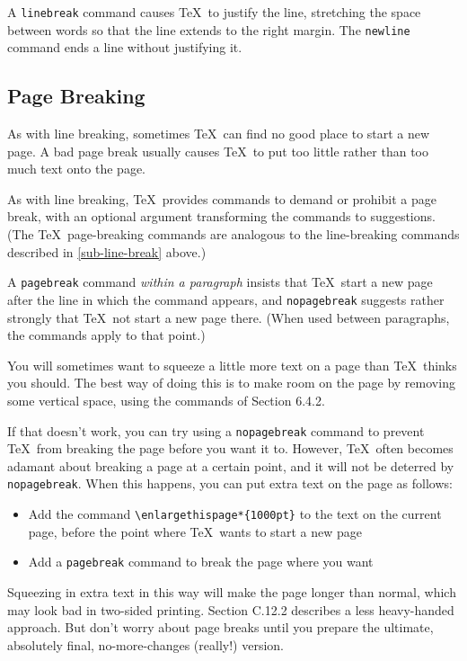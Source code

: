\documentclass{article}
\begin{document}
A \verb:linebreak: command causes \TeX\ to justify the line, stretching the space between words so that the line extends to the right margin. The \verb:newline: command ends a line without justifying it.

\subsection{Page Breaking}

As with line breaking, sometimes \TeX\ can find no good place to start a new page. A bad page break
usually causes \TeX\ to put too little rather than too much text onto the page.

As with line breaking, \TeX\ provides commands to demand or prohibit a page break, with an optional
argument transforming the commands to suggestions. (The \TeX\ page-breaking commands are analogous
to the line-breaking commands described in \ref{sub-line-break} above.)

A \verb:pagebreak: command \emph{within a paragraph} insists that \TeX\ start a new page after
the line in which the command appears, and \verb:nopagebreak: suggests rather strongly
that \TeX\ not start a new page there. (When used between paragraphs, the commands apply to that
point.)

You will sometimes want to squeeze a little more text on a page than \TeX\ thinks you should. The
best way of doing this is to make room on the page by removing some vertical space, using the
commands of Section 6.4.2.

If that doesn't work, you can try using a \verb:nopagebreak: command to prevent \TeX\ from
breaking the page before you want it to. However, \TeX\ often becomes adamant about breaking a page
at a certain point, and it will not be deterred by \verb:nopagebreak:. When this happens, you
can put extra text on the page as follows:

\begin{itemize}
   \item Add the command \verb:\enlargethispage*{1000pt}: to the text on the current page, before
    the point where \TeX\ wants to start a new page
   
   \item Add a \verb:pagebreak: command to break the page where you want
\end{itemize}

Squeezing in extra text in this way will make the page longer than normal, which may look bad in
two-sided printing. Section C.12.2 describes a less heavy-handed approach. But don't worry about
page breaks until you prepare the ultimate, absolutely final, no-more-changes (really!) version.
\end{document}
